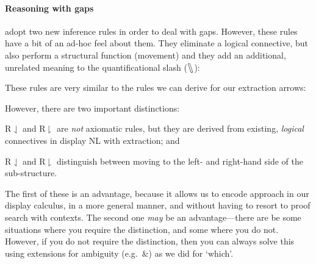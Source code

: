 \paragraph*{Reasoning with gaps}
\citet[][chapter 17.10]{barker2015} adopt two new inference rules in
order to deal with gaps. However, these rules have a bit of an ad-hoc
feel about them. They eliminate a logical connective, but also
perform a structural function (movement) and they add an additional,
unrelated meaning to the quantificational slash ($\fatbslash$):
\begin{center}
  \begin{pfbox}
  \end{pfbox}
  \begin{pfbox}
  \end{pfbox}
\end{center}
These rules are very similar to the rules we can derive for our
extraction arrows:
\begin{center}
  \begin{pfbox}
  \end{pfbox}
  \begin{pfbox}
  \end{pfbox}
\end{center}
However, there are two important distinctions:
\begin{enumerate*}[label=(\arabic*)]
\item R${\downharpoonleft}$ and R${\downharpoonright}$ are \emph{not}
  axiomatic rules, but they are derived from existing, \emph{logical}
  connectives in display NL with extraction; and
\item R${\downharpoonleft}$ and R${\downharpoonright}$ distinguish
  between moving to the left- and right-hand side of the
  sub-structure.
\end{enumerate*}
The first of these is an advantage, because it allows us to encode
 approach in our display calculus, in a more
general manner, and without having to resort to proof search with
contexts. The second one \emph{may} be an advantage---there are be
some situations where you require the distinction, and some where you
do not. However, if you do not require the distinction, then you can
always solve this using extensions for ambiguity (e.g.\ \&) as we did
for `which'.
